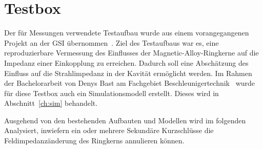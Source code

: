 \section{Testbox}
\label{sec:testbox}
Der f\"ur Messungen verwendete Testaufbau wurde aus einem vorangegangenen Projekt an der GSI \"ubernommen~\cite{harzheim2016modeling}. Ziel des Testaufbaus war es, eine reproduzierbare Vermessung des Einflusses der Magnetic-Alloy-Ringkerne auf die Impedanz einer Einkopplung zu erreichen. Dadurch soll eine Absch\"atzung des Einfluss auf die Strahlimpedanz in der Kavit\"at erm\"oglicht werden. Im Rahmen der Bachelorarbeit von Denys Bast am Fachgebiet Beschleunigertechnik~\cite{bast2017ba} wurde f\"ur diese Testbox auch ein Simulationsmodell erstellt. Dieses wird in Abschnitt~\ref{ch:sim} behandelt. 
\par
Ausgehend von den bestehenden Aufbauten und Modellen wird im folgenden Analysiert, inwiefern ein oder mehrere Sekund\"are Kurzschl\"usse die Feldimpedanz\"anderung des Ringkerns annulieren k\"onnen. 

